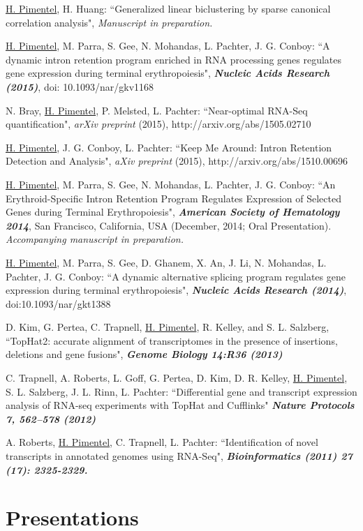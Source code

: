 \documentclass[margin,line]{res}
\begin{document}
\begin{resume}
\underline{H. Pimentel}, H. Huang: ``Generalized linear biclustering by sparse
canonical correlation analysis", {\emph{Manuscript in preparation.}}

\underline{H. Pimentel}, M. Parra, S. Gee, N. Mohandas, L. Pachter, J. G. Conboy: ``A dynamic intron retention program enriched in RNA processing genes regulates gene expression during terminal erythropoiesis", {\bf \emph{Nucleic Acids Research (2015)}}, doi: 10.1093/nar/gkv1168

N. Bray, \underline{H. Pimentel}, P. Melsted, L. Pachter: ``Near-optimal
RNA-Seq quantification", {\emph{arXiv preprint} (2015),
  http://arxiv.org/abs/1505.02710}

\underline{H. Pimentel}, J. G. Conboy, L. Pachter: ``Keep Me Around: Intron
Retention Detection and Analysis", {\emph{aXiv preprint} (2015), http://arxiv.org/abs/1510.00696}

\underline{H. Pimentel}, M. Parra, S. Gee, N. Mohandas, L. Pachter, J. G.
Conboy: ``An Erythroid-Specific Intron Retention Program Regulates Expression
of Selected Genes during Terminal Erythropoiesis", {\bf \emph{American Society
    of Hematology 2014}}, San Francisco, California, USA (December, 2014; Oral
Presentation). {\emph{Accompanying manuscript in preparation.}}

\underline{H. Pimentel}, M. Parra, S. Gee, D. Ghanem, X. An, J. Li, N.
Mohandas, L. Pachter, J. G. Conboy: ``A dynamic alternative splicing program
regulates gene expression during terminal erythropoiesis", {\bf \emph{Nucleic
    Acids Research (2014)}}, doi:10.1093/nar/gkt1388

D. Kim, G. Pertea, C. Trapnell, \underline{H. Pimentel}, R. Kelley, and S.
L. Salzberg, ``TopHat2: accurate alignment of transcriptomes in the presence of
insertions, deletions and gene fusions", {\bf \emph{Genome Biology
    14:R36 (2013)}}

C. Trapnell, A. Roberts, L. Goff, G. Pertea, D. Kim, D. R. Kelley,
\underline{H. Pimentel}, S. L. Salzberg, J. L. Rinn, L. Pachter: ``Differential
gene and transcript expression analysis of RNA-seq experiments with TopHat and
Cufflinks" {\bf \emph{Nature Protocols 7, 562–578 (2012)}}

A. Roberts, \underline{H. Pimentel}, C. Trapnell, L. Pachter: ``Identification
of novel transcripts in annotated genomes using RNA-Seq", {\bf
  \emph{Bioinformatics (2011) 27 (17): 2325-2329.}}

\newpage

\section{\sc Presentations}


\end{resume}
\end{document}
